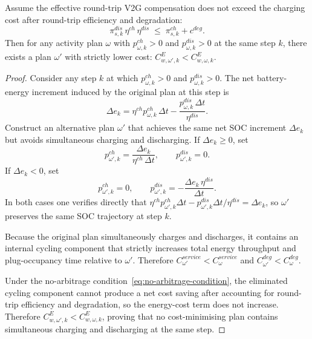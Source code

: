 \begin{proposition}
\label{prop:no-simultaneous}
Assume the effective round-trip V2G compensation does not exceed the
charging cost after round-trip efficiency and degradation:
\begin{equation}
  \pi^{dis}_{s,k}\,\eta^{ch}\,\eta^{dis}
  \;\le\;
  \pi^{ch}_{s,k} + c^{deg}.
  \label{eq:no-arbitrage-condition}
\end{equation}
Then for any activity plan $\omega$ with $p^{ch}_{\omega,k} > 0$ and
$p^{dis}_{\omega,k} > 0$ at the same step $k$, there exists a plan
$\omega'$ with strictly lower cost: $C^E_{w,\omega',k} < C^E_{w,\omega,k}$.
\end{proposition}
\begin{proof}
Consider any step $k$ at which $p^{ch}_{\omega,k}>0$ and
$p^{dis}_{\omega,k}>0$.  The net battery-energy increment induced by the
original plan at this step is
\begin{equation}
  \Delta e_k
  =
  \eta^{ch}p^{ch}_{\omega,k}\,\Delta t
  -
  \frac{p^{dis}_{\omega,k}\,\Delta t}{\eta^{dis}}.
  \label{eq:net-soc-increment}
\end{equation}
Construct an alternative plan $\omega'$ that achieves the same net SOC
increment $\Delta e_k$ but avoids simultaneous charging and discharging.
If $\Delta e_k \ge 0$, set
\begin{equation}
  p^{ch}_{\omega',k}
  = \frac{\Delta e_k}{\eta^{ch}\,\Delta t},
  \qquad
  p^{dis}_{\omega',k} = 0.
\end{equation}
If $\Delta e_k < 0$, set
\begin{equation}
  p^{ch}_{\omega',k} = 0,
  \qquad
  p^{dis}_{\omega',k}
  = -\frac{\Delta e_k\,\eta^{dis}}{\Delta t}.
\end{equation}
In both cases one verifies directly that
$\eta^{ch}p^{ch}_{\omega',k}\Delta t - p^{dis}_{\omega',k}\Delta t/\eta^{dis}
= \Delta e_k$, so $\omega'$ preserves the same SOC trajectory at step $k$.

Because the original plan simultaneously charges and discharges, it
contains an internal cycling component that strictly increases total
energy throughput and plug-occupancy time relative to $\omega'$.
Therefore $C^{service}_{\omega'} < C^{service}_{\omega}$ and
$C^{deg}_{\omega'} < C^{deg}_{\omega}$.

Under the no-arbitrage condition~\eqref{eq:no-arbitrage-condition}, the
eliminated cycling component cannot produce a net cost saving after
accounting for round-trip efficiency and degradation, so the energy-cost
term does not increase.  Therefore
$C^E_{w,\omega',k} < C^E_{w,\omega,k}$, proving that no cost-minimising
plan contains simultaneous charging and discharging at the same step.
\end{proof}

